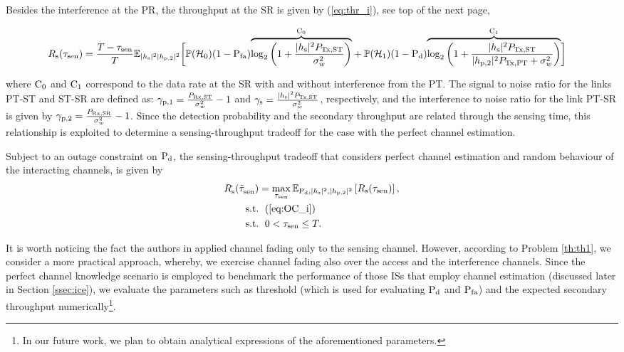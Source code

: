 Besides the interference at the PR, the throughput at the SR is given by (\ref{eq:thr_i}), see top of the next page,
\begin{figure}
\begin{align}
&\rs(\tsen) = \frac{T - \tsen}{T} \mathbb{E}_{\phs \phpt} \bigg[ \phz (1 - \pfa) \smash[b]{\overbrace{\log_2 \bigg( 1 + \frac{\phs \ptranst}{\npo} \bigg)}^{\cz}} + \pho (1 - \pd) \smash[b]{\overbrace{\log_2 \bigg( 1 + \frac{\phs \ptranst}{\phpt \ptranpt + \npo} \bigg)}^{\co}} \bigg] \label{eq:thr_i} 
\end{align}
\hrulefill
\vspace{-0.3cm}
\end{figure}
where $\text{C}_0$ and $\text{C}_1$ correspond to the data rate at the SR with and without interference from the PT. The signal to noise ratio for the links PT-ST and ST-SR are defined as: ${\gamma}_{\text{p,1}} = \frac{P_{\text{Rx,ST}}}{\sigma^2_{w}} - 1$ and ${\gamma}_{\text{s}} = \frac{|h_{\text{s}}|^2 P_{\text{Tx,ST}}}{\sigma^2_{w}}$, respectively, and the interference to noise ratio for the link PT-SR is given by ${\gamma}_{\text{p,2}} = \frac{P_{\text{Rx,SR}}}{\sigma^2_{w}} - 1$. %
Since the detection probability and the secondary throughput are related through the sensing time, this relationship is exploited to determine a sensing-throughput tradeoff for the case with the perfect channel estimation. 
\begin{theorem} \label{th:th1}
\normalfont
Subject to an outage constraint on $\text{P}_{\text{d}}$, the sensing-throughput tradeoff that considers perfect channel estimation and random behaviour of the interacting channels, is given by  
\begin{align}
\trsoc(\ttsenoc) &= \maxi_{\tsen} \e{\pd, \phs, \phpt}{\rs(\tsen)}, \label{eq:STT_i} \\
\text{s.t.} & \text{ }\;  (\ref{eq:OC_i}) \nonumber \\ 
\text{s.t.} & \text{ }\;  0 < \tsen \le T. \nonumber
\end{align}
\end{theorem}  
\begin{remark} \label{rem:rem1}
\normalfont
It is worth noticing the fact the authors in \cite{Juarez11} applied channel fading only to the sensing channel. However, according to Problem \ref{th:th1}, we consider a more practical approach, whereby, we exercise channel fading also over the access and the interference channels. Since the perfect channel knowledge scenario is employed to benchmark the performance of those ISs that employ channel estimation (discussed later in Section \ref{ssec:ice}), we evaluate the parameters such as threshold (which is used for evaluating $\text{P}_{\text{d}}$ and $\text{P}_{\text{fa}}$) and the expected secondary throughput numerically\footnote{In our future work, we plan to obtain analytical expressions of the aforementioned parameters.}. 
\end{remark}

